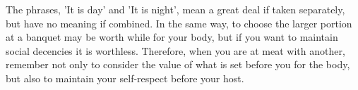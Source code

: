 The  phrases, 'It  is  day' and  'It  is night',  mean a  great  deal if  taken
separately, but  have no meaning  if combined. In the  same way, to  choose the
larger portion at a  banquet may be worth while for your body,  but if you want
to maintain social  decencies it is worthless. Therefore, when  you are at meat
with another, remember not only to consider the value of what is set before you
for the body, but also to maintain your self-respect before your host.
